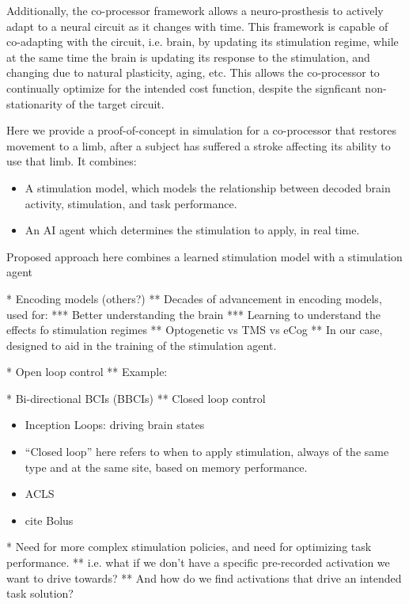 \documentclass[12pt]{iopart}
\begin{document}
Additionally, the co-processor framework allows a neuro-prosthesis to actively adapt to
a neural circuit as it changes with time. This framework is capable of co-adapting with
the circuit, i.e. brain, by updating its stimulation regime, while at the same time the
brain is updating its response to the stimulation, and changing due to natural plasticity,
aging, etc. This allows the co-processor to continually optimize for the intended cost
function, despite the signficant non-stationarity of the target circuit.

Here we provide a proof-of-concept in simulation for a co-processor that restores
movement to a limb, after a subject has suffered a stroke affecting its ability to
use that limb. It combines:
\begin{itemize}
	\item A stimulation model, which models the relationship between decoded brain activity,
	      stimulation, and task performance.
	\item An AI agent which determines the stimulation to apply, in real time.
\end{itemize}
Proposed approach here combines a learned stimulation model with a stimulation agent

* Encoding models \cite{shanechi.stimmodel} (others?)
** Decades of advancement in encoding models, used for:
*** Better understanding the brain
*** Learning to understand the effects fo stimulation regimes
** Optogenetic vs TMS vs eCog
** In our case, designed to aid in the training of the stimulation agent.

* Open loop control
** Example: \cite{khanna.openloop}

* Bi-directional BCIs (BBCIs)
** Closed loop control
\begin{itemize}
	\item \cite{walker.inception} Inception Loops: driving brain states
	\item \cite{kahana.biomarker} “Closed loop” here refers to when to apply stimulation, always of the same type and at the same site, based on memory performance.
	\item \cite{tafazoli.acls} ACLS
	\item cite Bolus
\end{itemize}

* Need for more complex stimulation policies, and need for optimizing task performance.
** i.e. what if we don't have a specific pre-recorded activation we want to drive towards?
** And how do we find activations that drive an intended task solution?
\end{document}
